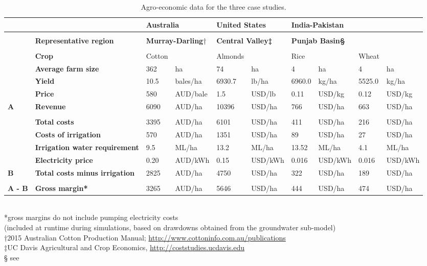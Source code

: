 \documentclass[12pt, a4paper]{article}
\begin{document}
\begin{table}
\caption{Agro-economic data for the three case studies.} \label{table: GCG agro-economic data}
\begin{adjustbox}{width=\textwidth}	
\begin{tabular}[]{lp{}p{}p{}p{}lp{}lll}
\toprule
& & \multicolumn{2}{l}{\textbf{Australia}} & \multicolumn{2}{l}{\textbf{United States}} & \multicolumn{4}{l}{\textbf{India-Pakistan}} \tabularnewline
\midrule
& & & & & & & & &\tabularnewline
& \textbf{Representative region} & \multicolumn{2}{l}{\textbf{Murray-Darling}†} & \multicolumn{2}{l}{\textbf{Central Valley‡}} & \multicolumn{4}{l}{\textbf{Punjab Basin§}}\tabularnewline
& & & & & & & & &\tabularnewline
& \textbf{Crop} & Cotton & & Almonds & & Rice & & Wheat
&\tabularnewline
& \textbf{Average farm size} & 362 & ha & 74 & ha & 4 & ha & 4 &
ha\tabularnewline
& \textbf{Yield} & 10.5 & bales/ha & 6930.7 & lb/ha & 6960.0 & kg/ha &
5525.0 & kg/ha\tabularnewline
& \textbf{Price} & 580 & AUD/bale & 1.5 & USD/lb & 0.11 & USD/kg & 0.12
& USD/kg\tabularnewline
\textbf{A} & \textbf{Revenue} & 6090 & AUD/ha & 10396 & USD/ha & 766 &
USD/ha & 663 & USD/ha\tabularnewline
& & & & & & & & &\tabularnewline
& \textbf{Total costs} & 3395 & AUD/ha & 6101 & USD/ha & 411 & USD/ha &
216 & USD/ha\tabularnewline
& \textbf{Costs of irrigation} & 570 & AUD/ha & 1351 & USD/ha & 89 &
USD/ha & 27 & USD/ha\tabularnewline
& \textbf{Irrigation water requirement} & 9.5 & ML/ha & 13.2 & ML/ha &
13.52 & ML/ha & 4.1 & ML/ha\tabularnewline
& \textbf{Electricity price} & 0.20 & AUD/kWh & 0.15 & USD/kWh & 0.016 &
USD/kWh & 0.016 & USD/kWh\tabularnewline
\textbf{B} & \textbf{Total costs minus irrigation} & 2825 & AUD/ha &
4750 & USD/ha & 322 & USD/ha & 189 & USD/ha\tabularnewline
& & & & & & & & &\tabularnewline
\textbf{A - B} & \textbf{Gross margin* } & 3265 & AUD/ha & 5646 & USD/ha
& 444 & USD/ha & 474 & USD/ha\tabularnewline
\bottomrule
\end{tabular}
\end{adjustbox}
\\
\footnotesize{*gross margins do not include pumping electricity costs \\(included at runtime during simulations, based on drawdowns obtained from the groundwater sub-model)}
\\
\footnotesize{†2015 Australian Cotton Production Manual; \url{http://www.cottoninfo.com.au/publications}}
\\
\footnotesize{‡UC Davis Agricultural and Crop Economics, \url{http://coststudies.ucdavis.edu}}
\\
\footnotesize{§ see \autocite{Jalota:2007ha,Singh:2009jo}}
\end{table}

\FloatBarrier


\printbibliography[title={Supplementary References}]
\end{document}
